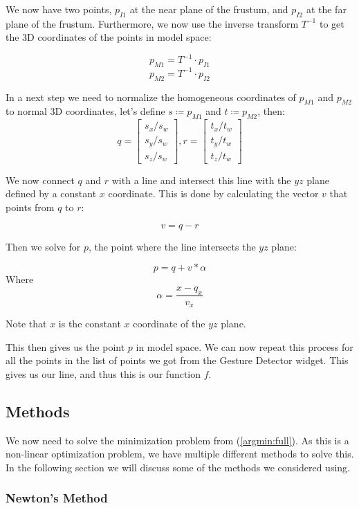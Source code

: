 We now have two points, $p_{I1}$ at the near plane of the frustum, and $p_{I2}$ at the far plane of the frustum. Furthermore, we now use the inverse transform $T^{-1}$ to get the 3D coordinates of the points in model space:

\[p_{M1} = T^{-1} \cdot p_{I1}\]
\[p_{M2} = T^{-1} \cdot p_{I2}\]

In a next step we need to normalize the homogeneous coordinates of $p_{M1}$ and $p_{M2}$ to normal 3D coordinates, let's define $s \coloneqq p_{M1}$ and $t \coloneqq p_{M2}$, then:
\[
    q = 
    \begin{bmatrix}
    s_x/s_w \\ s_y/s_w \\ s_z/s_w
    \end{bmatrix},
    r = 
    \begin{bmatrix}
    t_x/t_w \\ t_y/t_w \\ t_z/t_w
    \end{bmatrix}
    \]

We now connect $q$ and $r$ with a line and intersect this line with the $yz$ plane defined by a constant $x$ coordinate. This is done by calculating the vector $v$ that points from $q$ to $r$:

\[v = q - r\]

Then we solve for $p$, the point where the line intersects the $yz$ plane:

\[p = q + v * \alpha\] Where \[\alpha = \frac{x - q_x}{v_x}\]

Note that $x$ is the constant $x$ coordinate of the $yz$ plane.

This then gives us the point $p$ in model space. We can now repeat this process for all the points in the list of points we got from the Gesture Detector widget. This gives us our line, and thus this is our function $f$.

\subsection{Methods}

We now need to solve the minimization problem from (\ref{argmin:full}). As this is a non-linear optimization problem, we have multiple different methods to solve this. In the following section we will discuss
some of the methods we considered using. 

\subsubsection{Newton's Method}

